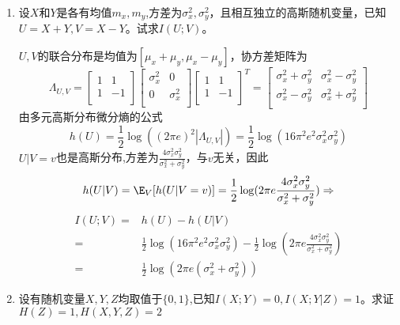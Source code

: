 \documentclass[a4paper]{article}
\begin{document}
\courseheader
{}

\begin{enumerate}
  \setlength{\itemsep}{3\parskip}

  \item 设$X$和$Y$是各有均值$m_x,m_y$,方差为$\sigma_x^2,\sigma_y^2$，且相互独立的高斯随机变量，已知$U=X+Y,V=X-Y$。试求$I(U;V)$。

\begin{solution}
$U,V$的联合分布是均值为$[\mu_x+\mu_y,\mu_x-\mu_y]$，协方差矩阵为
$$\Lambda_{U,V}=\begin{bmatrix}
1 & 1\\
1 & -1\\
\end{bmatrix}
\begin{bmatrix}
\sigma_x^2 & 0\\
0 & \sigma_x^2\\
\end{bmatrix}
\begin{bmatrix}
1 & 1\\
1 & -1\\
\end{bmatrix}^T
=\begin{bmatrix}
\sigma_x^2+\sigma_y^2 & \sigma_x^2-\sigma_y^2\\
\sigma_x^2-\sigma_y^2 & \sigma_x^2+\sigma_y^2\\
\end{bmatrix}
$$
由多元高斯分布微分熵的公式
$$
h(U)=\frac{1}{2}\log ((2\pi e)^2 |\Lambda_{U,V}|)=\frac{1}{2}\log(16\pi^2 e^2 \sigma^2_x\sigma^2_y)
$$
$U|V=v$也是高斯分布,方差为$\frac{4\sigma_x^2\sigma_y^2}{\sigma_x^2+\sigma_y^2}$，与$v$无关，因此
$$
h(U|V)=\E_{V}[h(U|V=v)]=\frac{1}{2}\log(2\pi e \frac{4\sigma_x^2\sigma_y^2}{\sigma_x^2+\sigma_y^2})\Rightarrow
$$
\begin{align*}
I(U;V)=& h(U)-h(U|V)\\
=&\frac{1}{2}\log(16\pi^2 e^2 \sigma^2_x\sigma^
2_y)-\frac{1}{2}\log(2\pi e \frac{4\sigma_x^2\sigma_y^2}{\sigma_x^2+\sigma_y^2})\\
=&\frac{1}{2}\log(2\pi e (\sigma_x^2+\sigma_y^2))
\end{align*}


\end{solution}

\item 设有随机变量$X,Y,Z$均取值于$\{0,1\}$,已知$I(X;Y)=0,I(X;Y|Z)=1$。求证$H(Z)=1,H(X,Y,Z)=2$


\end{enumerate}
\end{document}
